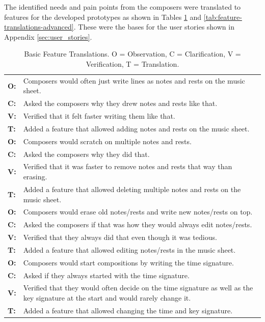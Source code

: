 		\newpage
		The identified needs and pain points from the composers were translated to features for the developed prototypes as shown in Tables \ref{tab:feature-translations-basic} and \ref{tab:feature-translations-advanced}. These were the bases for the user stories shown in Appendix \ref{sec:user_stories}.

		\begin{table} [H]
			\caption{Basic Feature Translations. O = Observation, C = Clarification, V = Verification, T = Translation.} \label{tab:feature-translations-basic}
			\vspace{0.20cm}   
			\begin{tabular}{|p{.5cm} p{13.5cm}|}
			  	\hline

			  	\textbf{O:} 	& Composers would often just write lines as notes and rests on the music sheet. \\
			  	\textbf{C:} 	& Asked the composers why they drew notes and rests like that. \\
			  	\textbf{V:} 	& Verified that it felt faster writing them like that. \\
			  	\textbf{T:} 	& Added a feature that allowed adding notes and rests on the music sheet. \\
			  	\hline

			  	\textbf{O:} 	& Composers would scratch on multiple notes and rests. \\
			  	\textbf{C:} 	& Asked the composers why they did that. \\
			  	\textbf{V:} 	& Verified that it was faster to remove notes and rests that way than erasing. \\
			  	\textbf{T:} 	& Added a feature that allowed deleting multiple notes and rests on the music sheet. \\
			  	\hline

			  	\textbf{O:} 	& Composers would erase old notes/rests and write new notes/rests on top. \\
			  	\textbf{C:} 	& Asked the composers if that was how they would always edit notes/rests. \\
			  	\textbf{V:} 	& Verified that they always did that even though it was tedious. \\
			  	\textbf{T:} 	& Added a feature that allowed editing notes/rests in the music sheet. \\
			  	\hline

			  	\textbf{O:} 	& Composers would start compositions by writing the time signature. \\
			  	\textbf{C:} 	& Asked if they always started with the time signature. \\
			  	\textbf{V:} 	& Verified that they would often decide on the time signature as well as the key signature at the start and would rarely change it. \\
			  	\textbf{T:} 	& Added a feature that allowed changing the time and key signature. \\
			  	\hline
			\end{tabular}
		\end{table}

